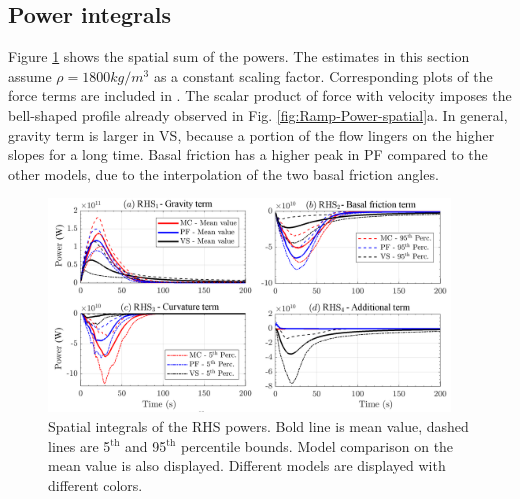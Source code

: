 \documentclass{article}
\begin{document}
\subsection{Power integrals}
Figure \ref{fig:Colima-Power-spatial} shows the spatial sum of the powers. The estimates in this section assume $\rho = 1800 kg/m^3$ as a constant scaling factor. Corresponding plots of the force terms are included in \cite{Patra2018}. The scalar product of force with velocity imposes the bell-shaped profile already observed in Fig. \ref{fig:Ramp-Power-spatial}a. In general, gravity term is larger in VS, because a portion of the flow lingers on the higher slopes for a long time. Basal friction has a higher peak in PF compared to the other models, due to the interpolation of the two basal friction angles.
\begin{figure}[H]
        \centering
        \includegraphics[width=0.95\textwidth]{figures/Colima/PowersColima.png}
        \caption{Spatial integrals of the RHS powers. Bold line is mean value, dashed lines are 5$^{\mathrm{th}}$ and 95$^{\mathrm{th}}$ percentile bounds. Model comparison on the mean value is also displayed. Different models are displayed with different colors.}
        \label{fig:Colima-Power-spatial}
\end{figure}
\end{document}
